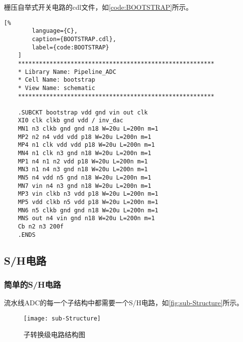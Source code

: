    \par 栅压自举式开关电路的cdl文件，如\autoref{code:BOOTSTRAP}所示。
    \begin{lstlisting}[%
        language={C},
        caption={BOOTSTRAP.cdl},
        label={code:BOOTSTRAP}
    ]
    ********************************************************
    * Library Name: Pipeline_ADC
    * Cell Name: bootstrap
    * View Name: schematic
    ********************************************************

    .SUBCKT bootstrap vdd gnd vin out clk
    XI0 clk clkb gnd vdd / inv_dac
    MN1 n3 clkb gnd gnd n18 W=20u L=200n m=1
    MP2 n2 n4 vdd vdd p18 W=20u L=200n m=1
    MP4 n1 clk vdd vdd p18 W=20u L=200n m=1
    MN4 n1 clk n3 gnd n18 W=20u L=200n m=1
    MP1 n4 n1 n2 vdd p18 W=20u L=200n m=1
    MN3 n1 n4 n3 gnd n18 W=20u L=200n m=1
    MN5 n4 vdd n5 gnd n18 W=20u L=200n m=1
    MN7 vin n4 n3 gnd n18 W=20u L=200n m=1
    MP3 vin clkb n3 vdd p18 W=20u L=200n m=1
    MP5 vdd clkb n5 vdd p18 W=20u L=200n m=1
    MN6 n5 clkb gnd gnd n18 W=20u L=200n m=1
    MNS out n4 vin gnd n18 W=20u L=200n m=1
    Cb n2 n3 200f
    .ENDS
    \end{lstlisting}

\subsection{S/H电路}
    \subsubsection{简单的S/H电路}
    流水线ADC的每一个子结构中都需要一个S/H电路，如\autoref{fig:sub-Structure}所示。
    \begin{figure}[ht]
        \centering
        \texttt{[image: sub-Structure]}
        \caption{\label{fig:sub-Structure}子转换级电路结构图}
    \end{figure}
    
